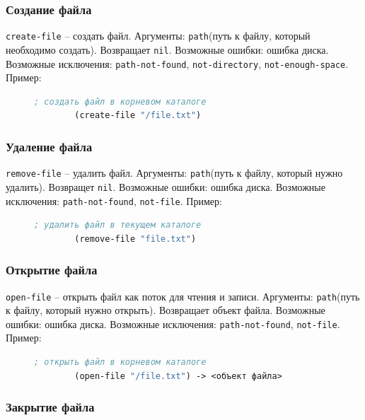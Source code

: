\subsubsection{Создание файла}

\texttt{create-file} -- создать файл. Аргументы: \texttt{path}(путь к файлу, который необходимо создать). Возвращает \texttt{nil}. Возможные ошибки: ошибка диска. Возможные исключения: \texttt{path-not-found}, \texttt{not-directory}, \texttt{not-enough-space}. Пример:
\begin{figure}[H]
	\begin{lstlisting}[language=Lisp]
		; создать файл в корневом каталоге
		(create-file "/file.txt")
	\end{lstlisting}
\end{figure}

\subsubsection{Удаление файла}

\texttt{remove-file} -- удалить файл. Аргументы: \texttt{path}(путь к файлу, который нужно удалить). Возвращет \texttt{nil}. Возможные ошибки: ошибка диска. Возможные исключения: \texttt{path-not-found}, \texttt{not-file}. Пример:
\begin{figure}[H]
	\begin{lstlisting}[language=Lisp]
		; удалить файл в текущем каталоге
		(remove-file "file.txt")
	\end{lstlisting}
\end{figure}

\subsubsection{Открытие файла}

\texttt{open-file} -- открыть файл как поток для чтения и записи. Аргументы: \texttt{path}(путь к файлу, который нужно открыть). Возвращает объект файла. Возможные ошибки: ошибка диска. Возможные исключения: \texttt{path-not-found}, \texttt{not-file}. Пример:
\begin{figure}[H]
	\begin{lstlisting}[language=Lisp]
		; открыть файл в корневом каталоге
		(open-file "/file.txt") -> <объект файла>
	\end{lstlisting}
\end{figure}

\subsubsection{Закрытие файла}

